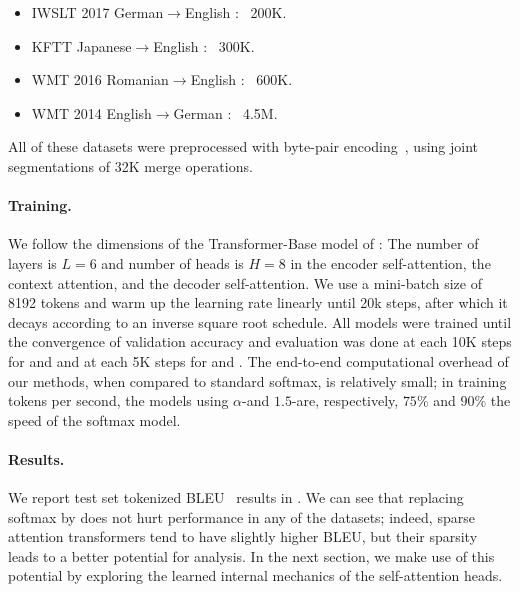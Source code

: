 \begin{itemize}[itemsep=.5ex,leftmargin=2ex]
    \item IWSLT 2017 German$\rightarrow$English
          \citep[,][]{cettolooverview}: ~200K.
    \item KFTT Japanese$\rightarrow$English
          \citep[,][]{neubig11kftt}: ~300K.
    \item WMT 2016 Romanian$\rightarrow$English
          \citep[,][]{bojar2016findings}: ~600K.
    \item WMT 2014 English$\rightarrow$German
          \citep[,][]{bojar2014findings}: ~4.5M.
\end{itemize}

All of these datasets were preprocessed with byte-pair
encoding~\citep[BPE;][]{sennrich2016neural}, using joint
segmentations of 32K merge operations.

\paragraph*{Training.}
We follow the dimensions of the Transformer-Base model of
\citet{vaswani2017attention}: The number of layers is $L=6$ and
number of heads is $H=8$ in the encoder self-attention, the context
attention, and the decoder self-attention. We use a mini-batch size
of 8192 tokens and warm up the learning rate linearly until 20k
steps, after which it decays according to an inverse square root
schedule. All models were trained until the convergence of validation
accuracy and evaluation was done at each 10K steps for
 and  and at each 5K steps for
 and . The end-to-end computational
overhead of our methods, when compared to standard softmax, is
relatively small; in training tokens per second, the models using
$\alpha$-\entmaxtext and $1.5$-\entmaxtext are, respectively, $75\%$
and $90\%$ the speed of the softmax model.

\paragraph*{Results.}
We report test set tokenized BLEU~\citep{papineni2002bleu} results in
. We can see that replacing softmax by
\entmaxtext{} does not hurt performance in any of the datasets;
indeed, sparse attention transformers tend to have slightly higher
BLEU, but their sparsity leads to a better potential for analysis. In
the next section, we make use of this potential by exploring the
learned internal mechanics of the self-attention heads.

